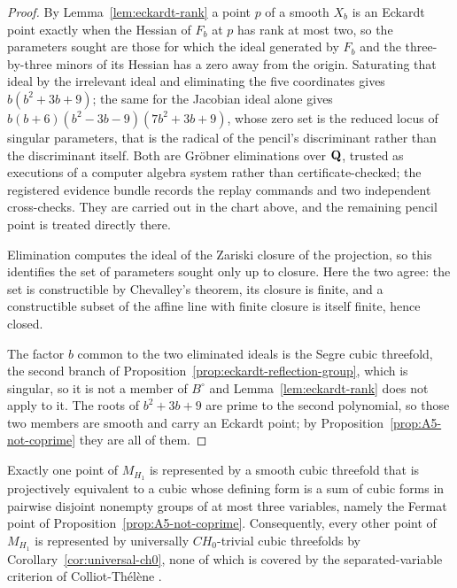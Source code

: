 \begin{proof}
By Lemma~\ref{lem:eckardt-rank} a point \(p\) of a smooth \(X_b\) is an
Eckardt point exactly when the Hessian of \(F_b\) at \(p\) has rank at most
two, so the parameters sought are those for which the ideal generated by
\(F_b\) and the three-by-three minors of its Hessian has a zero away from the
origin.
Saturating that ideal by the irrelevant ideal and eliminating the five
coordinates gives \(b(b^2+3b+9)\); the same for the Jacobian ideal alone gives
\(b(b+6)(b^2-3b-9)(7b^2+3b+9)\), whose zero set is the reduced locus of
singular parameters, that is the radical of the pencil's discriminant rather
than the discriminant itself.  Both are Gr\"obner eliminations over \(\mathbf Q\),
trusted as executions of a computer algebra system rather than
certificate-checked; the registered evidence bundle records the replay
commands and two independent cross-checks.  They are carried out in the chart
above, and the remaining pencil point is treated directly there.

Elimination computes the ideal of the Zariski closure of the projection, so
this identifies the set of parameters sought only up to closure.  Here the two
agree: the set is constructible by Chevalley's theorem, its closure is finite,
and a constructible subset of the affine line with finite closure is itself
finite, hence closed.

The factor \(b\) common to the two eliminated ideals is the Segre cubic
threefold, the second branch of
Proposition~\ref{prop:eckardt-reflection-group}, which is singular, so it is
not a member of \(B^\circ\) and Lemma~\ref{lem:eckardt-rank} does not apply to
it.  The roots of \(b^2+3b+9\)
are prime to the second polynomial, so those two members are smooth and carry
an Eckardt point; by Proposition~\ref{prop:A5-not-coprime} they are all of
them.
%
\end{proof}

\begin{proposition}
\label{prop:A5-nonseparated}
%
%
Exactly one point of \(M_{H_1}\) is
represented by a smooth cubic threefold that is
projectively equivalent to a cubic whose defining form is a sum of cubic
forms in pairwise disjoint nonempty groups of at most three variables, namely
the Fermat point of Proposition~\ref{prop:A5-not-coprime}.
Consequently, every other point of \(M_{H_1}\) is represented
by universally \(CH_0\)-trivial cubic threefolds by
Corollary~\ref{cor:universal-ch0}, none of which is covered by the
separated-variable criterion of Colliot-Th\'el\`ene \cite{CT}.
\end{proposition}

